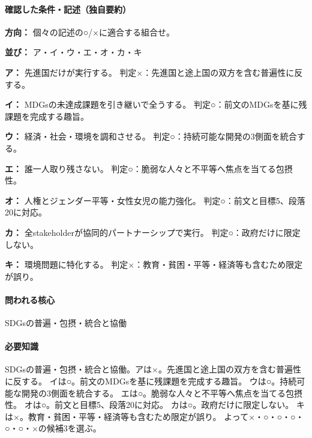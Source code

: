 \paragraph{確認した条件・記述（独自要約）}\mbox{}\par

\noindent\textbf{方向：} 個々の記述の○/×に適合する組合せ。\par

\noindent\textbf{並び：} ア・イ・ウ・エ・オ・カ・キ\par

\noindent\textbf{ア：} 先進国だけが実行する。 判定×：先進国と途上国の双方を含む普遍性に反する。\par

\noindent\textbf{イ：} MDGsの未達成課題を引き継いで全うする。 判定○：前文のMDGsを基に残課題を完成する趣旨。\par

\noindent\textbf{ウ：} 経済・社会・環境を調和させる。 判定○：持続可能な開発の3側面を統合する。\par

\noindent\textbf{エ：} 誰一人取り残さない。 判定○：脆弱な人々と不平等へ焦点を当てる包摂性。\par

\noindent\textbf{オ：} 人権とジェンダー平等・女性女児の能力強化。 判定○：前文と目標5、段落20に対応。\par

\noindent\textbf{カ：} 全stakeholderが協同的パートナーシップで実行。 判定○：政府だけに限定しない。\par

\noindent\textbf{キ：} 環境問題に特化する。 判定×：教育・貧困・平等・経済等も含むため限定が誤り。\par

\paragraph{問われる核心} SDGsの普遍・包摂・統合と協働

\paragraph{必要知識} SDGsの普遍・包摂・統合と協働。アは×。先進国と途上国の双方を含む普遍性に反する。 イは○。前文のMDGsを基に残課題を完成する趣旨。 ウは○。持続可能な開発の3側面を統合する。 エは○。脆弱な人々と不平等へ焦点を当てる包摂性。 オは○。前文と目標5、段落20に対応。 カは○。政府だけに限定しない。 キは×。教育・貧困・平等・経済等も含むため限定が誤り。 よって×・○・○・○・○・○・×の候補3を選ぶ。

